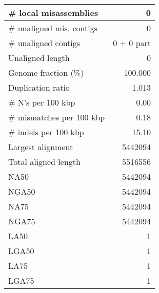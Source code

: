 \documentclass[12pt,a4paper]{article}
\begin{document}
\begin{table}[ht]
\begin{center}
\begin{tabular}{|l*{1}{|r}|}
\# local misassemblies & 0 \\ \hline
\# unaligned mis. contigs & 0 \\ \hline
\# unaligned contigs & 0 + 0 part \\ \hline
Unaligned length & 0 \\ \hline
Genome fraction (\%) & 100.000 \\ \hline
Duplication ratio & 1.013 \\ \hline
\# N's per 100 kbp & 0.00 \\ \hline
\# mismatches per 100 kbp & 0.18 \\ \hline
\# indels per 100 kbp & 15.10 \\ \hline
Largest alignment & 5442094 \\ \hline
Total aligned length & 5516556 \\ \hline
NA50 & 5442094 \\ \hline
NGA50 & 5442094 \\ \hline
NA75 & 5442094 \\ \hline
NGA75 & 5442094 \\ \hline
LA50 & 1 \\ \hline
LGA50 & 1 \\ \hline
LA75 & 1 \\ \hline
LGA75 & 1 \\ \hline
\end{tabular}
\end{center}
\end{table}
\end{document}
